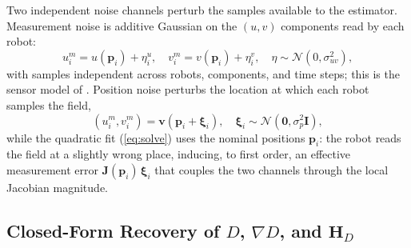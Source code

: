 \documentclass[lettersize,journal]{IEEEtran}
\begin{document}
Two independent noise channels perturb the samples available to the
estimator. Measurement noise is additive Gaussian on the $(u, v)$
components read by each robot:
\begin{equation}
    u_i^m = u(\mathbf{p}_i) + \eta_i^u, \quad
    v_i^m = v(\mathbf{p}_i) + \eta_i^v,
    \quad \eta \sim \mathcal{N}(0, \sigma_{uv}^2),
    \label{eq:meas_noise}
\end{equation}
with samples independent across robots, components, and time steps; this
is the sensor model of \cite{9}. Position noise perturbs the location at
which each robot samples the field,
\begin{equation}
    (u_i^m, v_i^m) = \mathbf{v}(\mathbf{p}_i + \boldsymbol{\xi}_i), \quad
    \boldsymbol{\xi}_i \sim \mathcal{N}(\mathbf{0}, \sigma_p^2 \mathbf{I}),
    \label{eq:pos_noise}
\end{equation}
while the quadratic fit (\ref{eq:solve}) uses the nominal positions
$\mathbf{p}_i$: the robot reads the field at a slightly wrong place,
inducing, to first order, an effective measurement error
$\mathbf{J}(\mathbf{p}_i)\,\boldsymbol{\xi}_i$ that couples the two
channels through the local Jacobian magnitude.

\subsection{Closed-Form Recovery of $D$, $\nabla D$, and $\mathbf{H}_D$}
\end{document}
